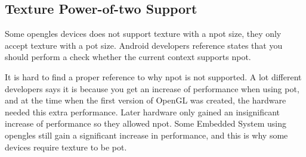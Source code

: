 \subsection{Texture Power-of-two Support}
Some \ac{opengles} devices does not support texture with a \ac{npot} size, they only accept texture with a \ac{pot} size. Android developers reference states that you should perform a check whether the current context supports \ac{npot}. \citep{glutils}

It is hard to find a proper reference to why \ac{npot} is not supported. A lot different developers says it is because you get an increase of performance when using \ac{pot}, and at the time when the first version of OpenGL was created, the hardware needed this extra performance. Later hardware only gained an insignificant increase of performance so they allowed \ac{npot}. Some Embedded System using \ac{opengles} still gain a significant increase in performance, and this is why some devices require texture to be \ac{pot}.

